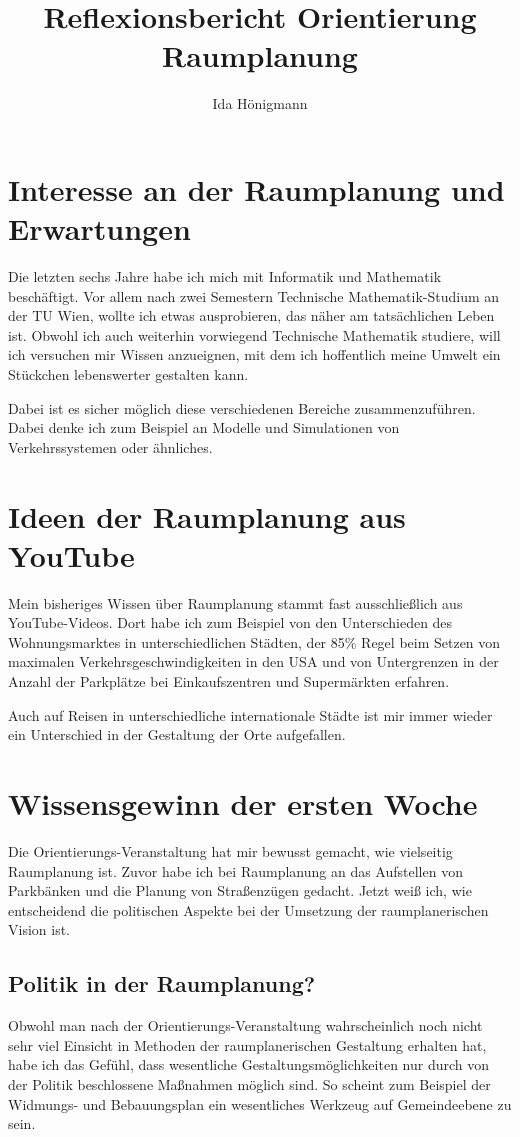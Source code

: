 \documentclass[]{article}
\title{Reflexionsbericht Orientierung Raumplanung}
\author{Ida Hönigmann}
\begin{document}
\maketitle

\section{Interesse an der Raumplanung und Erwartungen}
Die letzten sechs Jahre habe ich mich mit Informatik und Mathematik beschäftigt. Vor allem nach zwei Semestern Technische Mathematik-Studium an der TU Wien, wollte ich etwas ausprobieren, das näher am tatsächlichen Leben ist. Obwohl ich auch weiterhin vorwiegend Technische Mathematik studiere, will ich versuchen mir Wissen anzueignen, mit dem ich hoffentlich meine Umwelt ein Stückchen lebenswerter gestalten kann.

Dabei ist es sicher möglich diese verschiedenen Bereiche zusammenzuführen. Dabei denke ich zum Beispiel an Modelle und Simulationen von Verkehrssystemen oder ähnliches.

\section{Ideen der Raumplanung aus YouTube}
Mein bisheriges Wissen über Raumplanung stammt fast ausschließlich aus YouTube-Videos. Dort habe ich zum Beispiel von den Unterschieden des Wohnungsmarktes in unterschiedlichen Städten, der 85\% Regel beim Setzen von maximalen Verkehrsgeschwindigkeiten in den USA und von Untergrenzen in der Anzahl der Parkplätze bei Einkaufszentren und Supermärkten erfahren.

Auch auf Reisen in unterschiedliche internationale Städte ist mir immer wieder ein Unterschied in der Gestaltung der Orte aufgefallen.

\section{Wissensgewinn der ersten Woche}
Die Orientierungs-Veranstaltung hat mir bewusst gemacht, wie vielseitig Raumplanung ist. Zuvor habe ich bei Raumplanung an das Aufstellen von Parkbänken und die Planung von Straßenzügen gedacht. Jetzt weiß ich, wie entscheidend die politischen Aspekte bei der Umsetzung der raumplanerischen Vision ist.

\subsection{Politik in der Raumplanung?}
Obwohl man nach der Orientierungs-Veranstaltung wahrscheinlich noch nicht sehr viel Einsicht in Methoden der raumplanerischen Gestaltung erhalten hat, habe ich das Gefühl, dass wesentliche Gestaltungsmöglichkeiten nur durch von der Politik beschlossene Maßnahmen möglich sind. So scheint zum Beispiel der Widmungs- und Bebauungsplan ein wesentliches Werkzeug auf Gemeindeebene zu sein.
\end{document}
